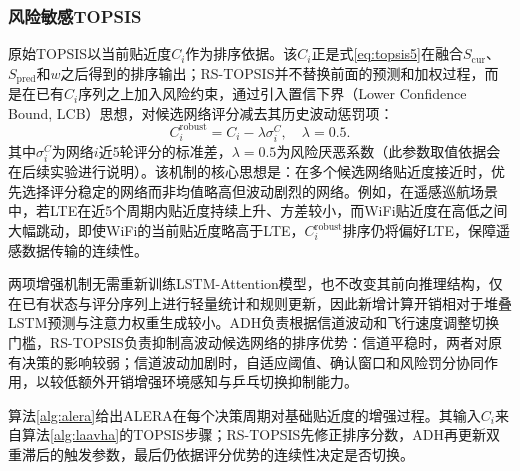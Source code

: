 \documentclass[10pt,a4paper]{ctexart}
\begin{document}
\subsubsection{风险敏感TOPSIS}

原始TOPSIS以当前贴近度$C_i$作为排序依据。该$C_i$正是式\eqref{eq:topsis5}在融合$S_{\mathrm{cur}}$、$S_{\mathrm{pred}}$和$w$之后得到的排序输出；RS-TOPSIS并不替换前面的预测和加权过程，而是在已有$C_i$序列之上加入风险约束，通过引入置信下界（Lower Confidence Bound, LCB）思想，对候选网络评分减去其历史波动惩罚项：
\begin{equation}
C_i^{\mathrm{robust}}=C_i-\lambda\sigma_i^C,\quad \lambda=0.5.
\label{eq:rstopsis}
\end{equation}
其中$\sigma_i^C$为网络$i$近5轮评分的标准差，$\lambda=0.5$为风险厌恶系数（此参数取值依据会在后续实验进行说明）。该机制的核心思想是：在多个候选网络贴近度接近时，优先选择评分稳定的网络而非均值略高但波动剧烈的网络。例如，在遥感巡航场景中，若LTE在近5个周期内贴近度持续上升、方差较小，而WiFi贴近度在高低之间大幅跳动，即使WiFi的当前贴近度略高于LTE，$C_i^{\mathrm{robust}}$排序仍将偏好LTE，保障遥感数据传输的连续性。

两项增强机制无需重新训练LSTM-Attention模型，也不改变其前向推理结构，仅在已有状态与评分序列上进行轻量统计和规则更新，因此新增计算开销相对于堆叠LSTM预测与注意力权重生成较小。ADH负责根据信道波动和飞行速度调整切换门槛，RS-TOPSIS负责抑制高波动候选网络的排序优势：信道平稳时，两者对原有决策的影响较弱；信道波动加剧时，自适应阈值、确认窗口和风险罚分协同作用，以较低额外开销增强环境感知与乒乓切换抑制能力。

算法\ref{alg:alera}给出ALERA在每个决策周期对基础贴近度的增强过程。其输入$C_i$来自算法\ref{alg:laavha}的TOPSIS步骤；RS-TOPSIS先修正排序分数，ADH再更新双重滞后的触发参数，最后仍依据评分优势的连续性决定是否切换。
\end{document}
